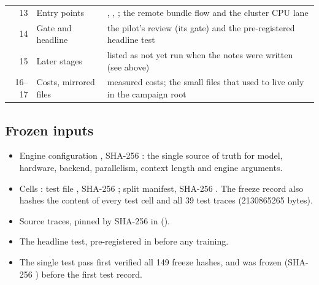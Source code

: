 \begin{table}[tbp]
\begin{tabularx}{\linewidth}{@{}rlY@{}}
    13 & Entry points & , , ; the remote bundle flow and
      the cluster CPU lane \\
    14 & Gate and headline & the pilot's review (its gate) and the pre-registered headline test \\
    15 & Later stages & listed as not yet run when the notes were written (see above) \\
    16--17 & Costs, mirrored files & measured costs; the small files that used to live only in the
      campaign root \\
    \bottomrule
  \end{tabularx}
\end{table}

\subsection{Frozen inputs}

\begin{itemize}
  \item Engine configuration , SHA-256 : the single source
    of truth for model, hardware, backend, parallelism, context length and engine arguments.
  \item Cells : test file , SHA-256 ;
    split manifest, SHA-256 . The freeze record 
    also hashes the content of every test cell and all 39 test traces (\num{2130865265} bytes).
  \item Source traces, pinned by SHA-256 in  ().
  \item The headline test, pre-registered in  before any training.
  \item The single test pass first verified all 149 freeze hashes, and 
    was frozen (SHA-256 ) before the first test record.
\end{itemize}

